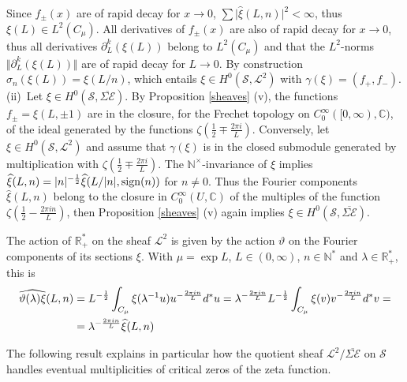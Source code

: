 \documentclass{pspum-l}
\theoremstyle{definition}
\theoremstyle{remark}
\numberwithin{equation}{section}
\def\C{{\mathbb C}}
\def\R{{\mathbb R}}
\def\cE{{\mathcal E}}
\def\cL{{\mathcal L}}
\def\rep{\vartheta}
\def\nt{\N^{\times}}
\def\N{{\mathbb N}}
\def\scal2{{\mathscr S}}
\begin{document}
 Since $f_\pm(x)$ are of rapid decay for $x\to 0$,  $\sum \vert \widehat \xi(L,n)\vert^2<\infty$, thus $\xi(L)\in L^2(C_\mu)$. All derivatives of $f_\pm(x)$ are also of rapid decay for $x\to 0$, thus all derivatives $\partial_L^k(\xi(L))$ belong to $L^2(C_\mu)$ and that the $L^2$-norms $\Vert\partial_L^k(\xi(L))\Vert$ are of rapid decay for $L\to 0$.  By construction  $\sigma_n(\xi(L))=\xi(L/n)$, which entails  $\xi\in H^0(\scal2,\cL^2)$ with $\gamma(\xi)=(f_+,f_-)$.\newline
 (ii)~Let $\xi \in H^0(\scal2,\overline{\Sigma\cE})$. By Proposition \ref{sheaves} (v),   the functions  $f_\pm=\widehat \xi(L,\pm 1)$ are in the closure,  for the Frechet topology on $C_0^{\infty}([0,\infty),\C)$, of the ideal generated by the functions $\zeta\left(\frac 12 \mp\frac{ 2\pi i }{L}\right)$. Conversely, let $\xi \in H^0(\scal2,\cL^2)$ and assume that $\gamma(\xi)$ is in the closed submodule generated by multiplication with $\zeta\left(\frac 12 \mp \frac{ 2\pi i}{L}\right)$. The $\nt$-invariance of $\xi$ implies $\widehat \xi(L,n)=\vert n\vert^{-\frac 12}\widehat \xi(L/\vert n\vert,{\rm sign}(n))$ for $n\neq 0$. Thus the Fourier components $\widehat \xi(L,n)$ belong to the closure in $C_0^{\infty}(U,\C)$ of the multiples of the function $\zeta\left(\frac 12-\frac{2\pi i n}{L}\right)$, then Proposition \ref{sheaves} (v) again implies $\xi \in H^0(\scal2,\overline{\Sigma\cE})$.\endproof 
 
 The action of  $\R_+^*$  on the  sheaf $\cL^2$  is given by the action  $\rep$  on the Fourier components of its  sections $\xi$. With $\mu=\exp L$, $L\in (0,\infty)$, $n\in\N^*$ and $\lambda\in\R^*_+$, this is 
 \begin{align}\label{action}
 \widehat {\rep(\lambda)\xi}(L,n)&=L^{-\frac 12}\int_{C_\mu} \xi(\lambda^{-1}u)u^{-\frac{2\pi i n}{L}}d^*u =\lambda^{-\frac{2\pi i n}{L}} L^{-\frac 12}\int_{C_\mu} \xi(v)v^{-\frac{2\pi i n}{L}}d^*v=\\&=\lambda^{-\frac{2\pi i n}{L}}\widehat \xi(L,n)\notag
 \end{align}
 
The following result  explains in particular how the quotient sheaf $\cL^2/\overline{\Sigma\cE}$ on $\scal2$  handles eventual multiplicities of critical zeros of the zeta function.
   
\end{document}

